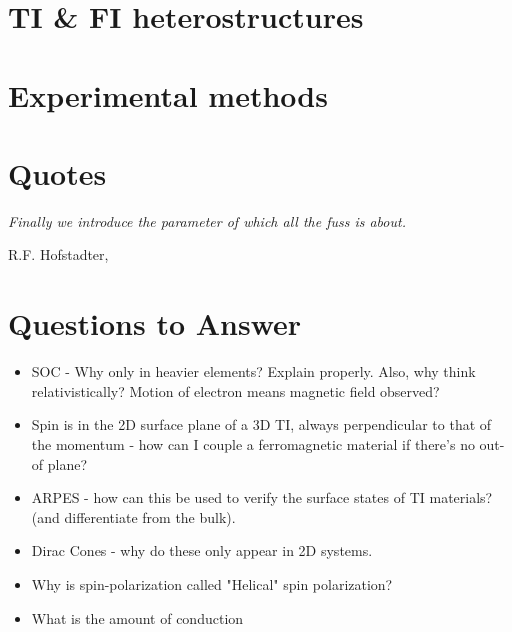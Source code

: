 \documentclass{article} %
\begin{document}
\section{TI \& FI heterostructures}


\section{Experimental methods}


%

\section{Quotes}
\epigraph{\textit{Finally we introduce the parameter of which all the fuss is about.}}{R.F. Hofstadter, \textit{\cite{hofstadter_energy_1976}}}

\section{Questions to Answer}
	\begin{itemize}
		\item SOC - Why only in heavier elements? Explain properly. Also, why think relativistically? Motion of electron means magnetic field observed?
		\item Spin is in the 2D surface plane of a 3D TI, always perpendicular to that of the momentum - how can I couple a ferromagnetic material if there's no out-of plane?
		\item ARPES - how can this be used to verify the surface states of TI materials? (and differentiate from the bulk).
		\item Dirac Cones - why do these only appear in 2D systems.
		\item Why is spin-polarization called "Helical" spin polarization?
		\item What is the amount of conduction 
	\end{itemize}
 
%
\end{document}
